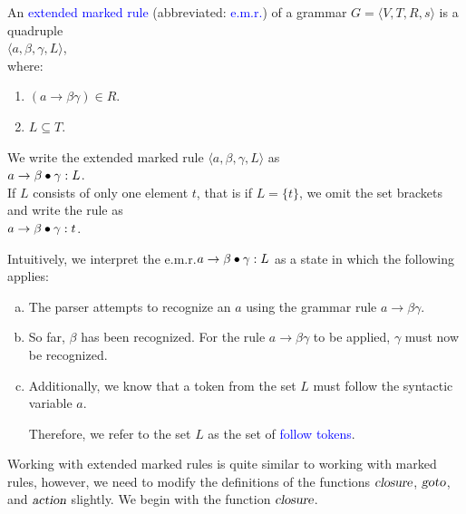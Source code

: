 \begin{Definition} \hspace*{\fill}\linebreak
  An \textcolor{blue}{extended marked rule}  (abbreviated: \textcolor{blue}{e.m.r.\@}) 
  of a grammar 
  $G = \langle V, T, R, s \rangle$ is a quadruple 
  \\[0.2cm]
  \hspace*{1.3cm}
  $\langle a, \beta, \gamma, L \rangle$,
  \\[0.2cm]
  where:
  \begin{enumerate}
  \item $(a \rightarrow \beta \gamma) \in R$.
  \item $L \subseteq T$.
  \end{enumerate}
  We write the extended marked rule $\langle a, \beta, \gamma, L \rangle$ as
  \\[0.2cm]
  \hspace*{1.3cm}
  $a \rightarrow \beta \mdot \gamma: L$.
  \\[0.2cm]
  If $L$ consists of only one element $t$, that is if $L = \{ t \}$,
  we omit the set brackets and write the rule as
  \\[0.2cm]
  \hspace*{1.3cm}
  $a \rightarrow \beta \mdot \gamma:t$. \eox
\end{Definition}

\noindent
Intuitively, we interpret the e.m.r.\@ $a \rightarrow \beta \mdot \gamma: L$ as a state in which the following applies:
\begin{enumerate}[(a)]
\item The parser attempts to recognize an $a$ using the grammar rule $a \rightarrow \beta \gamma$.
\item So far, $\beta$ has been recognized. For the rule $a \rightarrow \beta \gamma$ to be applied, $\gamma$ must now be recognized.
\item Additionally, we know that a token from the set $L$ must follow the syntactic variable $a$.

      Therefore, we refer to the set $L$ as the set of \textcolor{blue}{follow tokens}.
\end{enumerate}

Working with extended marked rules is quite similar to working with marked rules, however, we need to modify the definitions of the functions $\textsl{closure}$, $\textsl{goto}$, and $\textsl{action}$ slightly. We begin with the function $\textsl{closure}$.

